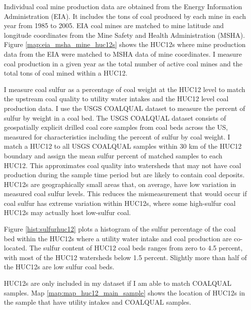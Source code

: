 \documentclass[12pt]{article}
\begin{document}
Individual coal mine production data are obtained from the Energy Information Administration (EIA). It includes the tons of coal produced by each mine in each year from 1985 to 2005. EIA coal mines are matched to mine latitude and longitude coordinates from the Mine Safety and Health Administration (MSHA). Figure \ref{map:eia_msha_mine_huc12s} shows the HUC12s where mine production data from the EIA were matched to MSHA data of mine coordinates. I measure coal production in a given year as the total number of active coal mines and the total tons of coal mined within a HUC12.


I measure coal sulfur as a percentage of coal weight at the HUC12 level to match the upstream coal quality to utility water intakes and the HUC12 level coal production data. I use the USGS COALQUAL dataset to measure the percent of sulfur by weight in a coal bed. The USGS COALQUAL dataset consists of geospatially explicit drilled coal core samples from coal beds across the US, measured for characteristics including the percent of sulfur by coal weight. I match a HUC12 to all USGS COALQUAL samples within 30 km of the HUC12 boundary and assign the mean sulfur percent of matched samples to each HUC12. This approximates coal quality into watersheds that may not have coal production during the sample time period but are likely to contain coal deposits. HUC12s are geographically small areas that, on average, have low variation in measured coal sulfur levels. This reduces the mismeasurement that would occur if coal sulfur has extreme variation within HUC12s, where some high-sulfur coal HUC12s may actually host low-sulfur coal.

Figure \ref{hist:sulfurhuc12} plots a histogram of the sulfur percentage of the coal bed within the HUC12s where a utility water intake and coal production are co-located. The sulfur content of HUC12 coal beds ranges from zero to 4.5 percent, with most of the HUC12 watersheds below 1.5 percent. Slightly more than half of the HUC12s are low sulfur coal beds.

HUC12s are only included in my dataset if I am able to match COALQUAL samples. Map \ref{map:map_huc12_main_sample} shows the location of HUC12s in the sample that have utility intakes and COALQUAL samples.
\end{document}
